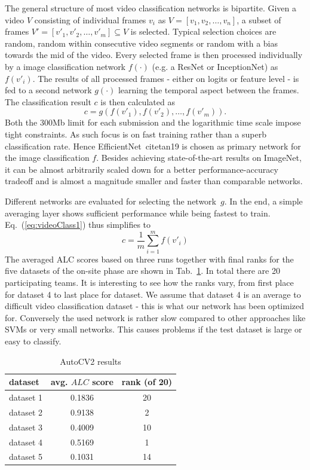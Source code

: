 \documentclass{article}
\begin{document}
The general structure of most video classification networks is bipartite. Given a video $V$ consisting of individual frames $v_i$ as $V = [v_1, v_2, \ldots, v_n]$, a subset of frames $V' = [v'_1, v'_2, \ldots, v'_m] \subseteq V$ is selected. Typical selection choices are random, random within consecutive video segments or random with a bias towards the mid of the video. Every selected frame is then processed individually by a image classification network $f(\cdot)$ (e.g. a ResNet or InceptionNet) as $f(v'_i)$. The results of all processed frames - either on logits or feature level - is fed to a second network $g(\cdot)$ learning the temporal aspect between the frames. The classification result $c$ is then calculated as 
%
\begin{equation}
c = g\left(f(v'_1), f(v'_2), \ldots, f(v'_m) \right).
\label{eq:videoClass1}
\end{equation}
%
Both the 300Mb limit for each submission and the logarithmic time scale impose tight constraints. As such focus is on fast training rather than a superb classification rate. Hence EfficientNet~cite{tan19} is chosen as primary network for the image classification $f$. Besides achieving state-of-the-art results on ImageNet, it can be almost arbitrarily scaled down for a better performance-accuracy tradeoff and is almost a magnitude smaller and faster than comparable networks. 

Different networks are evaluated for selecting the network~$g$. In the end, a simple averaging layer shows sufficient performance while being fastest to train. Eq.~(\ref{eq:videoClass1}) thus simplifies to 
%
\begin{equation}
c = \frac{1}{m}\sum\limits_{i=1}^m f(v'_i)
\label{eq:videoClass2}
\end{equation}
%
The averaged ALC scores based on three runs together with final ranks for the five datasets of the on-site phase are shown in Tab.~\ref{table:autocv2}. In total there are 20 participating teams. It is interesting to see how the ranks vary, from first place for dataset 4 to last place for dataset. We assume that dataset 4 is an average to difficult video classification dataset - this is what our network has been optimized for. Conversely the used network is rather slow compared to other approaches like SVMs or very small networks. This causes problems if the test dataset is large or easy to classify. 
%
\begin{table}
\center
\begin{tabular}{|l|c|c|}
\hline
dataset & avg. $ALC$ score & rank (of 20) \\
\hline
dataset 1 & 0.1836 & 20 \\
dataset 2 & 0.9138 & 2  \\
dataset 3 & 0.4009 & 10 \\
dataset 4 & 0.5169 & 1  \\
dataset 5 & 0.1031 & 14 \\
\hline
\end{tabular}
\normalsize
\caption{AutoCV2 results}
\label{table:autocv2}
\end{table}
\end{document}
